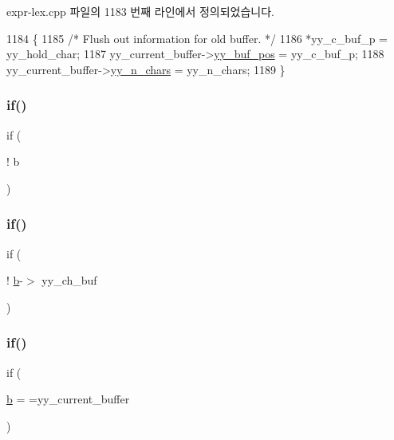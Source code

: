 expr-\/lex.\+cpp 파일의 1183 번째 라인에서 정의되었습니다.


\begin{DoxyCode}
1184                 \{
1185                 \textcolor{comment}{/* Flush out information for old buffer. */}
1186                 *yy\_c\_buf\_p = yy\_hold\_char;
1187                 yy\_current\_buffer->\mbox{\hyperlink{structyy__buffer__state_a58aa927f098b99d99e75da80f9b681ef}{yy\_buf\_pos}} = yy\_c\_buf\_p;
1188                 yy\_current\_buffer->\mbox{\hyperlink{structyy__buffer__state_a06406208824817acfec2183b79080945}{yy\_n\_chars}} = yy\_n\_chars;
1189                 \}
\end{DoxyCode}
\mbox{\label{expr-lex_8cpp_a9bf79ca516efbf960603adf3563802dc}} 
\subsubsection{\texorpdfstring{if()}{if()}\hspace{0.1cm}{\footnotesize\ttfamily [5/9]}}
{\footnotesize\ttfamily if (\begin{DoxyParamCaption}\item[{!}]{b }\end{DoxyParamCaption})}

\mbox{\label{expr-lex_8cpp_a3d50472f9bfe9159e10300a257ce89e5}} 
\subsubsection{\texorpdfstring{if()}{if()}\hspace{0.1cm}{\footnotesize\ttfamily [6/9]}}
{\footnotesize\ttfamily if (\begin{DoxyParamCaption}\item[{! \mbox{\hyperlink{expr-lex_8cpp_a91b64995742fd30063314f12340b4b5a}{b}}-\/$>$}]{yy\+\_\+ch\+\_\+buf }\end{DoxyParamCaption})}

\mbox{\label{expr-lex_8cpp_a9778f369b0dee28e4fc554e8fb5ca277}} 
\subsubsection{\texorpdfstring{if()}{if()}\hspace{0.1cm}{\footnotesize\ttfamily [7/9]}}
{\footnotesize\ttfamily if (\begin{DoxyParamCaption}\item[{\mbox{\hyperlink{expr-lex_8cpp_a91b64995742fd30063314f12340b4b5a}{b}}}]{ = {\ttfamily =yy\+\_\+current\+\_\+buffer} }\end{DoxyParamCaption})}

